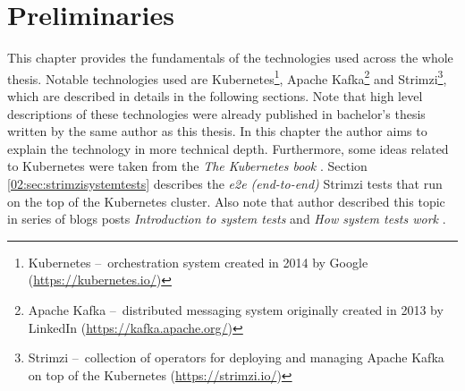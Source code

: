 \chapter{Preliminaries}
\label{02:chapter:title}

This chapter provides the fundamentals of the technologies used across the whole thesis.
Notable technologies used are Kubernetes\footnote{Kubernetes \---\ orchestration system created in 2014 by Google (\url{https://kubernetes.io/})}, Apache Kafka\footnote{Apache Kafka \---\ distributed messaging system originally created in 2013 by LinkedIn (\url{https://kafka.apache.org/})} and Strimzi\footnote{Strimzi \---\ collection of operators for deploying and managing Apache Kafka on top of the Kubernetes (\url{https://strimzi.io/})}, which are described in details in the following sections.
Note that high level descriptions of these technologies were already published in bachelor's thesis \cite{02-bachelor-thesis} written by the same author as this thesis.
In this chapter the author aims to explain the technology in more technical depth.
Furthermore, some ideas related to Kubernetes were taken from the \emph{The Kubernetes book} \cite{kubernetesBook}.
Section \ref{02:sec:strimzisystemtests} describes the \emph{e2e (end-to-end)}  Strimzi tests that run on the top of the Kubernetes cluster.
Also note that author described this topic in series of blogs posts \emph{Introduction to system tests} \cite{02-blogpost-introduction-to-systemtest} and \emph{How system tests work} \cite{02-blogpost-how-systemtest-work}.